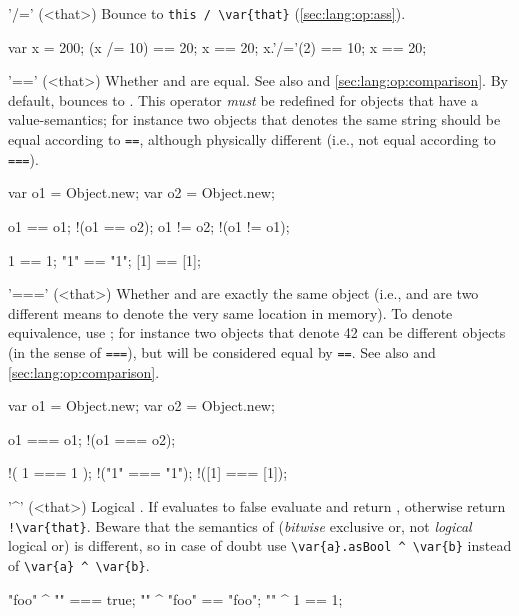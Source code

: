 \begin{urbiscriptapi}
\item['/='](<that>)%
  Bounce to \lstinline|this / \var{that}| (\autoref{sec:lang:op:ass}).
\begin{urbiassert}
var x = 200;
(x /= 10) == 20;  x == 20;
x.'/='(2) == 10;  x == 20;
\end{urbiassert}


\item['=='](<that>)%
  Whether \this and \that are equal.  See also  and
  \autoref{sec:lang:op:comparison}.  By default, bounces to
  .  This operator \emph{must} be redefined for objects that
  have a value-semantics; for instance two  objects that
  denotes the same string should be equal according to \lstinline|==|,
  although physically different (i.e., not equal according to
  \lstinline|===|).
\begin{urbiassert}
var o1 = Object.new;
var o2 = Object.new;

      o1 == o1;
    !(o1 == o2);
      o1 != o2;
    !(o1 != o1);

      1  ==  1;
     "1" == "1";
     [1] == [1];
\end{urbiassert}


\item['==='](<that>)%
  Whether \this and \that are exactly the same object (i.e., \this and \that
  are two different means to denote the very same location in memory).  To
  denote equivalence, use ; for instance two 
  objects that denote 42 can be different objects (in the sense of
  \lstinline|===|), but will be considered equal by \lstinline|==|.  See
  also  and \autoref{sec:lang:op:comparison}.
\begin{urbiassert}
var o1 = Object.new;
var o2 = Object.new;

      o1 === o1;
    !(o1 === o2);

    !( 1  ===  1 );
    !("1" === "1");
    !([1] === [1]);
\end{urbiassert}


\item['^'](<that>)%
  Logical . If \this evaluates to false evaluate and
  return , otherwise return \lstinline|!\var{that}|.  Beware that
  the semantics of  (\emph{bitwise} exclusive or, not
  \emph{logical} logical or) is different, so in case of doubt use
  \lstinline|\var{a}.asBool ^ \var{b}| instead of
  \lstinline|\var{a} ^ \var{b}|.
\begin{urbiassert}
"foo" ^ "" === true;
"" ^ "foo" == "foo";
"" ^ 1     == 1;


\end{urbiassert}
\end{urbiscriptapi}
